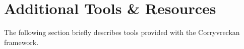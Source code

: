 \chapter{Additional Tools \& Resources}
\label{ch:additional_tools_resources}

The following section briefly describes tools provided with the Corryvreckan framework.

\label{sec:jobsub}
